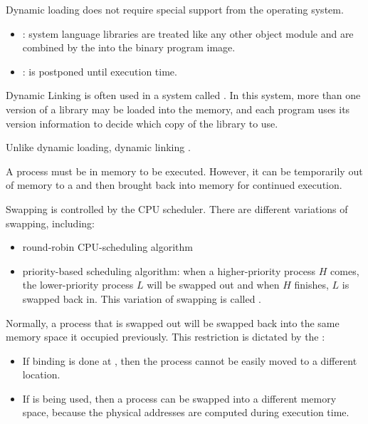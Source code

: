     \par Dynamic loading does not require special support from the operating system.

    \begin{itemize}
      \item {}: system language libraries are treated like any other object module and are combined by the  into the binary program image.
      \item {}:  is postponed until execution time.
    \end{itemize}
    \par Dynamic Linking is often used in a system called . In this system, more than one version of a library may be loaded into the memory, and each program uses its version information to decide which copy of the library to use.
    \par Unlike dynamic loading, dynamic linking .


    \par A process must be in memory to be executed. However, it can be  temporarily out of memory to a  and then brought back into memory for continued execution.

  \par Swapping is controlled by the CPU scheduler. There are different variations of swapping, including:
    \begin{itemize}
      \item round-robin CPU-scheduling algorithm
      \item priority-based scheduling algorithm: when a higher-priority process $H$ comes, the lower-priority process $L$ will be swapped out and when $H$ finishes, $L$ is swapped back in. This variation of swapping is called .
    \end{itemize}

    \par Normally, a process that is swapped out will be swapped back into the same memory space it occupied previously. This restriction is dictated by the :
    \begin{itemize}
      \item  If binding is done at , then the process cannot be easily moved to a different location.
      \item If  is being used, then a process can be swapped into a different memory space, because the physical addresses are computed during execution time.
    \end{itemize}

